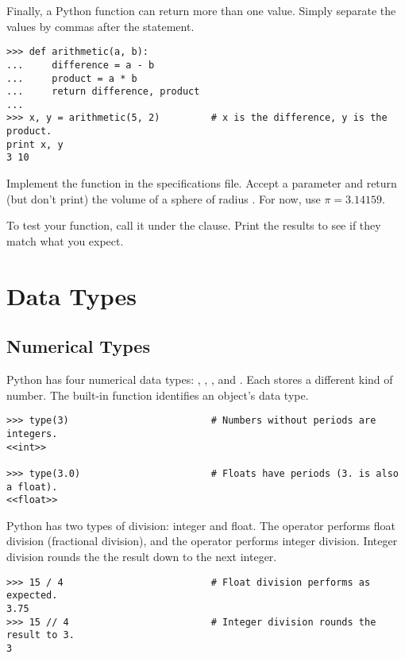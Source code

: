 Finally, a Python function can return more than one value.
Simply separate the values by commas after the  statement.

\begin{lstlisting}
>>> def arithmetic(a, b):
...     difference = a - b
...     product = a * b
...     return difference, product
...
>>> x, y = arithmetic(5, 2)         # x is the difference, y is the product.
print x, y
3 10
\end{lstlisting}

\begin{problem}
Implement the  function in the specifications file.
Accept a parameter  and return (but don't print) the volume of a sphere of radius .
For now, use $\pi=3.14159$.

To test your function, call it under the  clause.
Print the results to see if they match what you expect.
\end{problem}

\section*{Data Types}


\subsection*{Numerical Types}
Python has four numerical data types: , , 
, and .
Each stores a different kind of number.
The built-in function  identifies an object's data type.

\begin{lstlisting}
>>> type(3)                         # Numbers without periods are integers.
<<int>>

>>> type(3.0)                       # Floats have periods (3. is also a float).
<<float>>
\end{lstlisting}

Python has two types of division: integer and float.
The \li{/} operator performs float division (fractional division), and the \li{//} operator performs integer division.
Integer division rounds the the result down to the next integer.

\begin{lstlisting}
>>> 15 / 4                          # Float division performs as expected.
3.75
>>> 15 // 4                         # Integer division rounds the result to 3.
3
\end{lstlisting}

